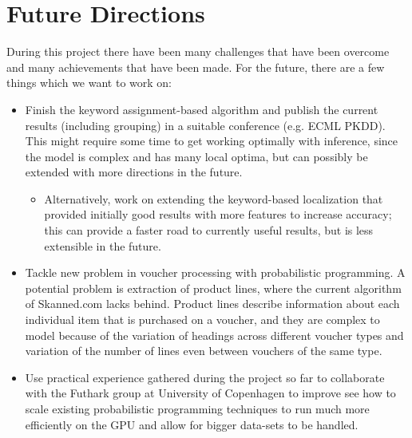 \documentclass[12pt,a4paper]{article}
\begin{document}
\section{Future Directions}
During this project there have been many challenges that have been overcome and
many achievements that have been made.
For the future, there are a few things which we want to work on:
\begin{itemize}
\item Finish the keyword assignment-based algorithm and publish the current
  results (including grouping) in a suitable conference (e.g. ECML PKDD). This
  might require some time to get working optimally with inference, since the
  model is complex and has many local optima, but can possibly be extended with
  more directions in the future.
  \begin{itemize}
  \item Alternatively, work on extending the
  keyword-based localization that provided initially good results with more
  features to increase accuracy; this can provide a faster road to currently useful
  results, but is less extensible in the future.
  \end{itemize}
\item Tackle new problem in voucher processing with probabilistic programming. A
  potential problem is extraction of product lines, where the current algorithm of
  Skanned.com lacks behind. Product lines describe information about each individual item
  that is purchased on a voucher, and they are complex to model because of the
  variation of headings across different voucher types and variation of the number of
  lines even between vouchers of the same type.
\item Use practical experience gathered during the project so far
  to collaborate with the Futhark group at University of Copenhagen to improve
  see how to scale existing probabilistic programming techniques to run much
  more efficiently on the GPU and allow for bigger data-sets to be handled.
\end{itemize}

\medskip

\printbibliography[
heading=bibintoc,
title={Bibliography}
] 

\clearpage
\end{document}
